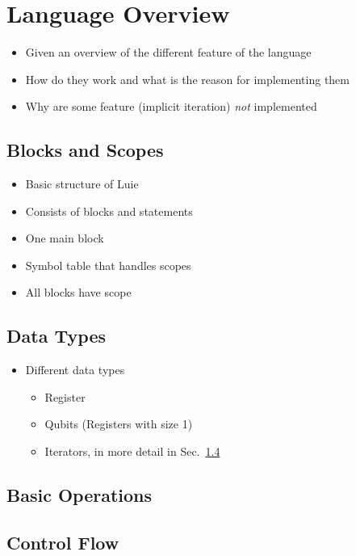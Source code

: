 \section{Language Overview}
\begin{itemize}
    \item Given an overview of the different feature of the language\
    \item How do they work and what is the reason for implementing them
    \item Why are some feature (\eg implicit iteration) \emph{not} implemented
\end{itemize}

\subsection{Blocks and Scopes}
\begin{itemize}
    \item Basic structure of Luie
    \item Consists of blocks and statements
    \item One main block
    \item Symbol table that handles scopes
    \item All blocks have scope 
\end{itemize}

\subsection{Data Types}
\begin{itemize}
    \item Different data types
    \begin{itemize}
        \item Register
        \item Qubits (Registers with size 1)
        \item Iterators, in more detail in Sec.~\ref{sec:control_flow}
    \end{itemize}
\end{itemize}


\subsection{Basic Operations}

\subsection{Control Flow}
\label{sec:control_flow}

